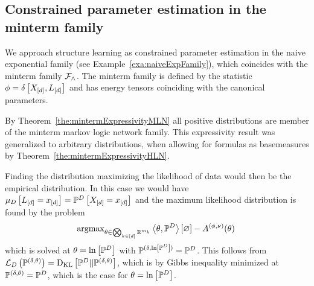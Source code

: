 





\subsection{Constrained parameter estimation in the minterm family}


We approach structure learning as constrained parameter estimation in the naive exponential family (see Example~\ref{exa:naiveExpFamily}), which coincides with the minterm family $\mathcal{F}_{\land}$.
The minterm family is defined by the statistic $\phi = \delta\left[X_{[d]}, L_{[d]}\right]$ and has energy tensors coinciding with the canonical parameters.

By Theorem~\ref{the:mintermExpressivityMLN} all positive distributions are member of the minterm markov logic network family.
This expressivity result was generalized to arbitrary distributions, when allowing for formulas as basemeasures by Theorem~\ref{the:mintermExpressivityHLN}.

Finding the distribution maximizing the likelihood of data would then be the empirical distribution.
In this case we would have $\mu_{D}\left[L_{[d]}=x_{[d]}\right] = \mathbb{P}^{D}\left[X_{[d]}=x_{[d]}\right]$ and the maximum likelihood distribution is found by the problem
\begin{align*}
	\mathrm{argmax}_{\theta\in\bigotimes_{k\in[d]} \mathbb{R}^{m_{k}}}  \left\langle \theta,\mathbb{P}^{D}\right\rangle \left[ \varnothing \right] - A^{(\phi,\nu)}(\theta) \, 
\end{align*}
which is solved at $\theta=\ln \left[ \mathbb{P}^{D} \right]$ with $\mathbb{P}^{(\delta,\ln \left[ \mathbb{P}^{D} \right])}= \mathbb{P}^{D}$.
This follows from $\mathcal{L}_{D}\left(\mathbb{P}^{(\delta,\theta)}\right)=\mathrm{D}_{\mathrm{KL}}\left[ \mathbb{P}^{D} || \mathbb{P}^{(\delta,\theta)} \right]$, which is by Gibbs inequality minimized at $\mathbb{P}^{(\delta,\theta)}=\mathbb{P}^{D}$, which is the case for $\theta = \ln \left[ \mathbb{P}^{D} \right]$.

